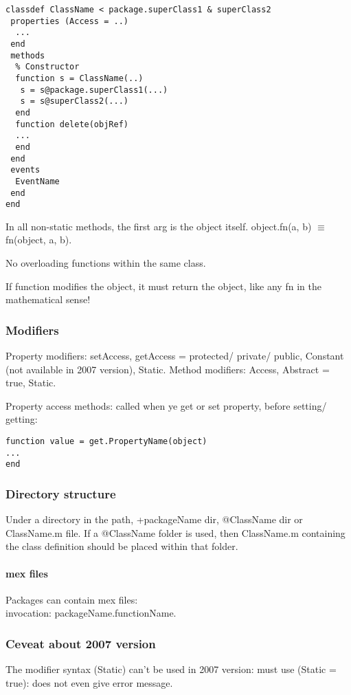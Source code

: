 \begin{verbatim}
classdef ClassName < package.superClass1 & superClass2
 properties (Access = ..)
  ...
 end
 methods
  % Constructor
  function s = ClassName(..)
   s = s@package.superClass1(...)
   s = s@superClass2(...)
  end
  function delete(objRef)
  ...
  end
 end
 events
  EventName
 end
end
\end{verbatim}

In all non-static methods, the first arg is the object itself. object.fn(a, b) $\equiv$ fn(object, a, b).

No overloading functions within the same class.

If function modifies the object, it must return the object, like any fn in the mathematical sense!

\subsubsection{Modifiers}
Property modifiers: setAccess, getAccess = protected/ private/ public, Constant (not available in 2007 version), Static. Method modifiers: Access, Abstract = true, Static.

Property access methods: called when ye get or set property, before setting/ getting:
\begin{verbatim}
function value = get.PropertyName(object)
...
end
\end{verbatim}

\subsubsection{Directory structure}
Under a directory in the path, +packageName dir, @ClassName dir or ClassName.m file. If a @ClassName folder is used, then ClassName.m containing the class definition should be placed within that folder.

\paragraph*{mex files}
Packages can contain mex files: \\
invocation: packageName.functionName.

\subsubsection{Ceveat about 2007 version}
The modifier syntax (Static) can't be used in 2007 version: must use (Static = true): does not even give error message.

